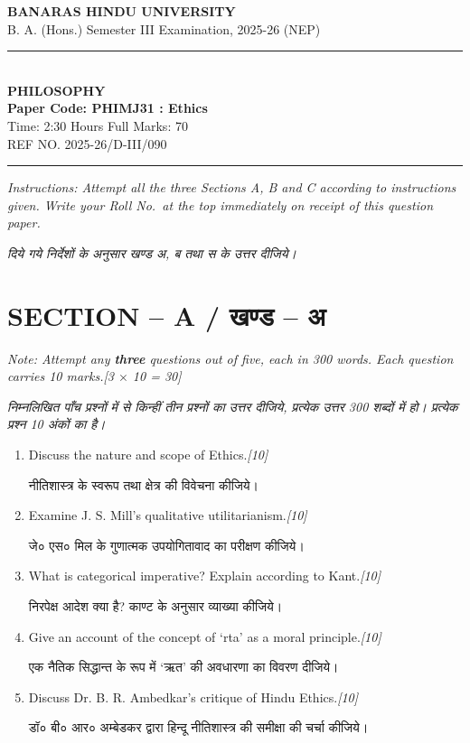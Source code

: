\documentclass[11pt,a4paper]{article}
\newcommand{\pts}[1]{\hfill \textit{[#1]}}
\begin{document}
\begin{center}
  {\large\bfseries BANARAS HINDU UNIVERSITY}\\[2pt]
  {\normalsize B. A. (Hons.) Semester III Examination, 2025-26 (NEP)}\\[6pt]
  \rule{0.8\linewidth}{0.5pt}\\[6pt]
  {\large\bfseries PHILOSOPHY}\\[4pt]
  {\large\bfseries Paper Code: PHIMJ31 : Ethics}\\[4pt]
  {\normalsize Time: 2:30 Hours \hfill Full Marks: 70}\\[2pt]
  {\small REF NO. 2025-26/D-III/090}
\end{center}
\rule{\linewidth}{0.4pt}
\smallskip

\noindent \textit{Instructions: Attempt all the three Sections A, B and C according to instructions given. Write your Roll No.\ at the top immediately on receipt of this question paper.}

\smallskip
\noindent \textit{दिये गये निर्देशों के अनुसार खण्ड अ, ब तथा स के उत्तर दीजिये।}

\bigskip

\section*{SECTION -- A / खण्ड -- अ}
\noindent \textit{Note: Attempt any \textbf{three} questions out of five, each in 300 words. Each question carries 10 marks.}\pts{3 $\times$ 10 = 30}

\noindent \textit{निम्नलिखित पाँच प्रश्नों में से किन्हीं तीन प्रश्नों का उत्तर दीजिये, प्रत्येक उत्तर 300 शब्दों में हो। प्रत्येक प्रश्न 10 अंकों का है।}

\begin{enumerate}[label=\textbf{\arabic*.},leftmargin=*,itemsep=12pt]

  \item Discuss the nature and scope of Ethics.\pts{10}
  
  नीतिशास्त्र के स्वरूप तथा क्षेत्र की विवेचना कीजिये।

  \item Examine J. S. Mill's qualitative utilitarianism.\pts{10}
  
  जे० एस० मिल के गुणात्मक उपयोगितावाद का परीक्षण कीजिये।

  \item What is categorical imperative? Explain according to Kant.\pts{10}
  
  निरपेक्ष आदेश क्या है? काण्ट के अनुसार व्याख्या कीजिये।

  \item Give an account of the concept of `rta' as a moral principle.\pts{10}
  
  एक नैतिक सिद्धान्त के रूप में `ऋत' की अवधारणा का विवरण दीजिये।

  \item Discuss Dr. B. R. Ambedkar's critique of Hindu Ethics.\pts{10}
  
  डॉ० बी० आर० अम्बेडकर द्वारा हिन्दू नीतिशास्त्र की समीक्षा की चर्चा कीजिये।

\end{enumerate}
\end{document}
